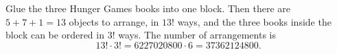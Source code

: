 Glue the three Hunger Games books into one block. Then there are $5+7+1=13$ objects to arrange, in $13!$ ways, and the three books inside the block can be ordered in $3!$ ways. The number of arrangements is
\[13!\cdot3!=6227020800\cdot6=\boxed{37362124800}.\]
